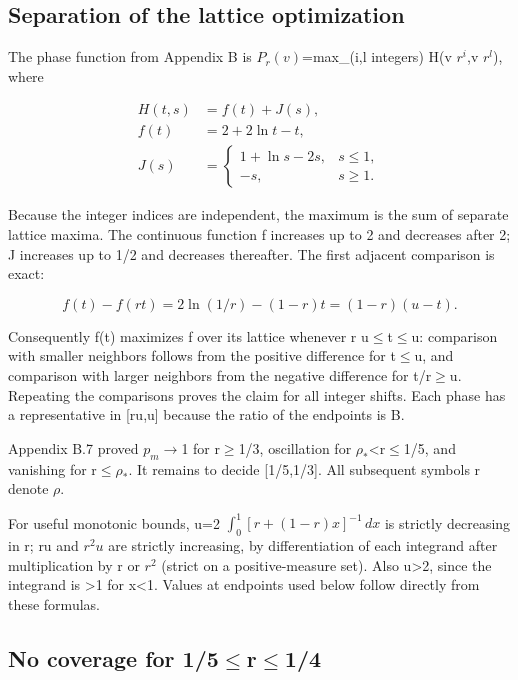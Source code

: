 \documentclass[11pt]{article}
\begin{document}
\subsection{Separation of the lattice optimization}

The phase function from Appendix B is $P_r(v)$=max\_(i,l integers) H(v $r^{i}$,v $r^{l}$), where

\[
\begin{aligned}H(t,s)&=f(t)+J(s),\\f(t)&=2+2\ln t-t,\\J(s)&=\begin{cases}1+\ln s-2s,&s\leq1,\\-s,&s\geq1.\end{cases}\end{aligned}
\]

Because the integer indices are independent, the maximum is the sum of separate lattice maxima. The continuous function f increases up to 2 and decreases after 2; J increases up to 1/2 and decreases thereafter. The first adjacent comparison is exact:

\[
f(t)-f(rt)=2\ln(1/r)-(1-r)t=(1-r)(u-t).
\]

Consequently f(t) maximizes f over its lattice whenever r u\ensuremath{\leq}t\ensuremath{\leq}u: comparison with smaller neighbors follows from the positive difference for t\ensuremath{\leq}u, and comparison with larger neighbors from the negative difference for t/r\ensuremath{\geq}u. Repeating the comparisons proves the claim for all integer shifts. Each phase has a representative in [ru,u] because the ratio of the endpoints is B.

Appendix B.7 proved $p_m$\ensuremath{\to}1 for r\ensuremath{\geq}1/3, oscillation for $\rho_{*}$<r\ensuremath{\leq}1/5, and vanishing for r\ensuremath{\leq}$\rho_{*}$. It remains to decide [1/5,1/3]. All subsequent symbols r denote $\rho$.

For useful monotonic bounds, u=2 $\int_0^1 [r+(1-r)x]^{-1}\,dx$ is strictly decreasing in r; ru and $r^2u$ are strictly increasing, by differentiation of each integrand after multiplication by r or $r^{2}$ (strict on a positive-measure set). Also u>2, since the integrand is >1 for x<1. Values at endpoints used below follow directly from these formulas.

\subsection{No coverage for 1/5\ensuremath{\leq}r\ensuremath{\leq}1/4}
\end{document}
